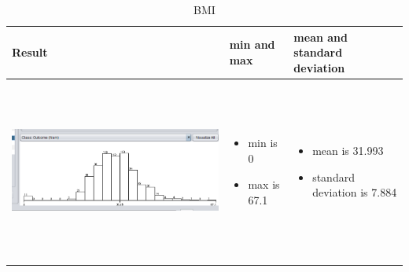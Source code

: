 \documentclass{article}
\begin{document}
\begin{table}[h!]
  \centering
  \begin{tabular}{ | m{5 cm} | m{3cm} | m{3cm} | }
    \hline
   Result &  min and max & mean and standard deviation \\ \hline
    \begin{minipage}{.3\textwidth}
      \includegraphics[width=\linewidth, height=60mm]{BMI.png}
    \end{minipage}
    &
      \begin{itemize}
        \item  min is 0
        \item max is 67.1
          
      \end{itemize}
    & 
      \begin{itemize}
        \item  mean is 31.993
        \item  standard deviation is 7.884  
          
      \end{itemize}
    \\ \hline
  \end{tabular}
  \caption{ BMI }\label{tbl:myLboro}
\end{table}
\end{document}
